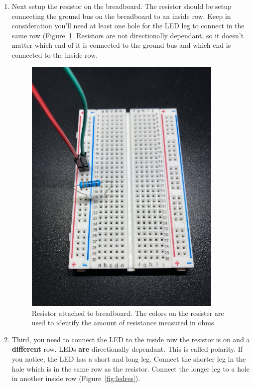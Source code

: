 \documentclass{article}\usepackage[]{graphicx}\usepackage[]{color}
\begin{document}
\begin{enumerate}
\item Next setup the resistor on the breadboard. The resistor should be setup connecting the ground bus on the breadboard to an inside row. Keep in consideration you'll need at least one hole for the LED leg to connect in the same row (Figure~\ref{fig:res}. Resistors are not directionally dependant, so it doesn't matter which end of it is connected to the ground bus and which end is connected to the inside row.
\begin{figure}
\includegraphics[width=0.90\textwidth]{res}
\caption{Resistor attached to breadboard. The colors on the resister are used to identify the amount of resistance measured in ohms. }
\label{fig:res}
\end{figure}
\item Third, you need to connect the LED to the inside row the resistor is on and a \textbf{different} row. LEDs \textbf{are} directionally dependant. This is called polarity. If you notice, the LED has a short and long leg. Connect the shorter leg in the hole which is in the same row as the resistor. Connect the longer leg to a hole in another inside row (Figure~\ref{fig:ledres}).

\end{enumerate}
\end{document}
